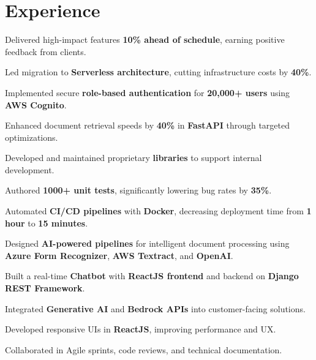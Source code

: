 \documentclass[]{deedy-resume-reversed}
\begin{document}
\begin{minipage}[t]{0.60\textwidth}

\section{Experience}

\vspace{\topsep}
\begin{tightemize}
\item Delivered high-impact features \textbf{10\% ahead of schedule}, earning positive feedback from clients.
\item Led migration to \textbf{Serverless architecture}, cutting infrastructure costs by \textbf{40\%}.
\item Implemented secure \textbf{role-based authentication} for \textbf{20,000+ users} using \textbf{AWS Cognito}.
\item Enhanced document retrieval speeds by \textbf{40\%} in \textbf{FastAPI} through targeted optimizations.
\item Developed and maintained proprietary \textbf{libraries} to support internal development.
\item Authored \textbf{1000+ unit tests}, significantly lowering bug rates by \textbf{35\%}.
\item Automated \textbf{CI/CD pipelines} with \textbf{Docker}, decreasing deployment time from \textbf{1 hour} to \textbf{15 minutes}.
\end{tightemize}

\begin{tightemize}
\item Designed \textbf{AI-powered pipelines} for intelligent document processing using \textbf{Azure Form Recognizer}, \textbf{AWS Textract}, and \textbf{OpenAI}.
\item Built a real-time \textbf{Chatbot} with \textbf{ReactJS frontend} and backend on \textbf{Django REST Framework}.
\item Integrated \textbf{Generative AI} and \textbf{Bedrock APIs} into customer-facing solutions.
\item Developed responsive UIs in \textbf{ReactJS}, improving performance and UX.
\item Collaborated in Agile sprints, code reviews, and technical documentation.
\end{tightemize}
\sectionsep


\end{minipage}
\end{document}

